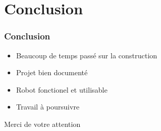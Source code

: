 \section{Conclusion}

\begin{frame}
  \frametitle{Conclusion}
  \begin{itemize}
    \item Beaucoup de temps passé sur la construction
    \item Projet bien documenté
    \item Robot fonctionel et utilisable
    \item Travail à poursuivre
  \end{itemize}
\end{frame}

\begin{frame}
  \begin{center}
    \LARGE Merci de votre attention
  \end{center}
\end{frame}

